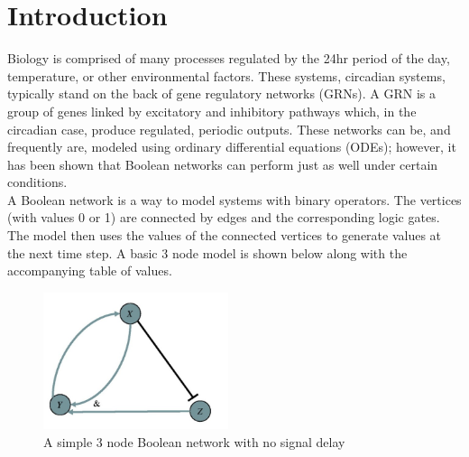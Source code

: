\documentclass[twoside,twocolumn,9pt]{article}
\begin{document}




\section{Introduction}

Biology is comprised of many processes regulated by the 24hr period of the day, temperature, or other environmental factors. These systems, circadian systems, typically stand on the back of gene regulatory networks (GRNs). A GRN is a group of genes linked by excitatory and inhibitory pathways which, in the circadian case, produce regulated, periodic outputs. These networks can be, and frequently are, modeled using ordinary differential equations (ODEs); however, it has been shown that Boolean networks can perform just as well under certain conditions\cite{digiclocks}.\\

A Boolean network is a way to model systems with binary operators. The vertices (with values 0 or 1) are connected by edges and the corresponding logic gates. The model then uses the values of the connected vertices to generate values at the next time step. A basic 3 node model is shown below along with the accompanying table of values.\\

\begin{figure}[h]
\centering
  \includegraphics[height=4cm]{basicbool}
  \caption{A simple 3 node Boolean network with no signal delay}
  \label{fgr:example}
\end{figure}
\end{document}
